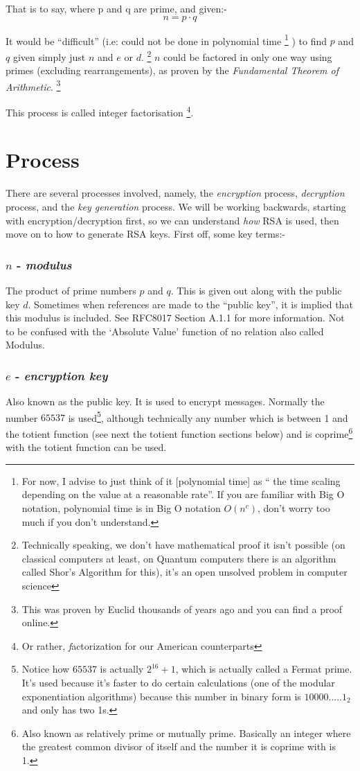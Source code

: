 \documentclass[twocolumn, a4paper,12pt]{article}
\begin{document}
That is to say, where p and q are prime,
and given:-
\[ n = p \cdot q \]

It would be ``difficult'' (i.e: could not be done in polynomial time
\footnote {For now, I advise to just think of it [polynomial time] as ``
the time scaling depending on the value at a reasonable rate''. If you are familiar with Big O notation, polynomial time is in Big O notation $O(n^{c})$, don't worry too much if you don't understand.}
) to find 
$p$ and $q$ given simply just $n$ and $e$ or $d$.
\footnote{Technically speaking, we don't have mathematical proof it isn't possible
(on classical computers at least, on Quantum computers there is an algorithm called Shor's
Algorithm for this), it's an open unsolved problem in computer science} 
$n$ could be factored 
in only one way using primes (excluding rearrangements), 
as proven by the {\em Fundamental Theorem of Arithmetic}.
\footnote{This was proven by Euclid thousands of years ago and you
can find a proof online.}


This process is called integer 
factorisation \footnote{ Or rather, {\emph factorization} for our American counterparts}.

\section{Process}
There are several processes involved, namely, the {\em encryption} process, {\em decryption}
process, and the {\em key generation} process. We will be working backwards, starting with
encryption/decryption first, so we can understand {\em how} RSA is used, then move on to
how to generate RSA keys. First off, some key terms:-

\subsubsection{\texorpdfstring{$n$}{n} - \emph{modulus}} 
The product of prime numbers $p$ and $q$. 
This is given out along with the public key $d$.
Sometimes when references are made to the ``public key'', it is implied that this modulus
is included. See RFC8017 \cite{rfc8017} Section A.1.1 for more information. Not to be confused with the `Absolute Value' function of no relation
also called Modulus.

\subsubsection{\texorpdfstring{$e$}{e} - \emph{encryption key}}
Also known as the public key. It is used to encrypt messages.
Normally the number $65537$ is used\footnote{Notice how $65537$ is actually $2^{16}+1$,
which is actually called a Fermat prime. It's used because it's faster to do certain
calculations (one of the modular exponentiation algorithms) 
because this number in binary form is $10000.....1_{2}$ and only has two 1s.}, although
technically any number which is between 1 and the totient function (see next the totient function
sections below) and is coprime\footnote{
Also known as relatively prime or mutually prime. Basically an integer where the greatest
common divisor of itself and the number it is coprime with is 1.
} with the totient function can be used.
\end{document}
